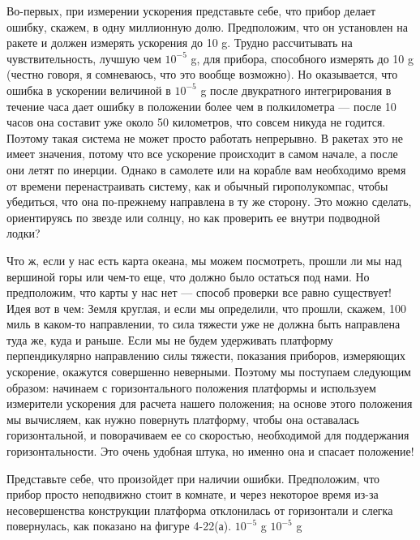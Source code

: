 \documentclass[10pt,oneside]{article}
\begin{document}
Во-первых, при измерении ускорения представьте себе, что прибор делает ошибку, скажем, в одну миллионную долю. Предположим, что он установлен на ракете и должен измерять ускорения до 10 g. Трудно рассчитывать на чувствительность, лучшую чем \(10^{-5}\) g, для прибора, способного измерять до 10 g (честно говоря, я сомневаюсь, что это вообще возможно). Но оказывается, что ошибка в ускорении величиной в \(10^{-5}\) g после двукратного интегрирования в течение часа дает ошибку в положении более чем в полкилометра --- после 10 часов она составит уже около 50 километров, что совсем никуда не годится. Поэтому такая система не может просто работать непрерывно. В ракетах это не имеет значения, потому что все ускорение происходит в самом начале, а после они летят по инерции. Однако в самолете или на корабле вам необходимо время от времени перенастраивать систему, как и обычный гирополукомпас, чтобы убедиться, что она по-прежнему направлена в ту же сторону. Это можно сделать, ориентируясь по звезде или солнцу, но как проверить ее внутри подводной лодки?\par

Что ж, если у нас есть карта океана, мы можем посмотреть, прошли ли мы над вершиной горы или чем-то еще, что должно было остаться под нами. Но предположим, что карты у нас нет --- способ проверки все равно существует! Идея вот в чем: Земля круглая, и если мы определили, что прошли, скажем, 100 миль в каком-то направлении, то сила тяжести уже не должна быть направлена туда же, куда и раньше. Если мы не будем удерживать платформу перпендикулярно направлению силы тяжести, показания приборов, измеряющих ускорение, окажутся совершенно неверными. Поэтому мы поступаем следующим образом: начинаем с горизонтального положения платформы и используем измерители ускорения для расчета нашего положения; на основе этого положения мы вычисляем, как нужно повернуть платформу, чтобы она оставалась горизонтальной, и поворачиваем ее со скоростью, необходимой для поддержания горизонтальности. Это очень удобная штука, но именно она и спасает положение!\par

Представьте себе, что произойдет при наличии ошибки. Предположим, что прибор просто неподвижно стоит в комнате, и через некоторое время из-за несовершенства конструкции платформа отклонилась от горизонтали и слегка повернулась, как показано на фигуре 4-22(а). \(10^{-5}\) g \(10^{-5}\) g\par
\end{document}
